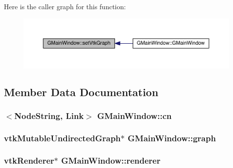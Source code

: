 Here is the caller graph for this function\+:\nopagebreak
\begin{figure}[H]
\begin{center}
\leavevmode
\includegraphics[width=350pt]{class_g_main_window_a464bcf8c3f6ec788398c275ff4bd800d_icgraph}
\end{center}
\end{figure}




\subsection{Member Data Documentation}
\hypertarget{class_g_main_window_a2cf6402d280d2fe91463ee9efa941e75}{
\subsubsection[{cn}]{$<${\bf Node\+String}, {\bf Link}$>$ G\+Main\+Window\+::cn\hspace{0.3cm}{\ttfamily [private]}}}\label{class_g_main_window_a2cf6402d280d2fe91463ee9efa941e75}
\hypertarget{class_g_main_window_ab97c0cde05fda7d301306e82daaeab57}{
\subsubsection[{graph}]{\setlength{\rightskip}{0pt plus 5cm}vtk\+Mutable\+Undirected\+Graph$\ast$ G\+Main\+Window\+::graph\hspace{0.3cm}{\ttfamily [private]}}}\label{class_g_main_window_ab97c0cde05fda7d301306e82daaeab57}
\hypertarget{class_g_main_window_a691d66ce40f6c4782519f50be5e70654}{
\subsubsection[{renderer}]{\setlength{\rightskip}{0pt plus 5cm}vtk\+Renderer$\ast$ G\+Main\+Window\+::renderer\hspace{0.3cm}{\ttfamily [private]}}}\label{class_g_main_window_a691d66ce40f6c4782519f50be5e70654}
